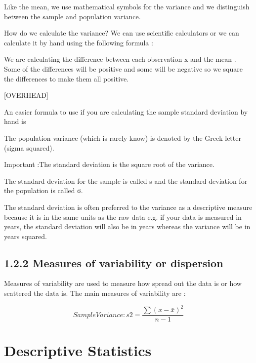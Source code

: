 \documentclass[]{report}
\begin{document}
Like the mean, we use mathematical symbols for the variance and we distinguish between the sample and population variance.






How do we calculate the variance? We can use scientific calculators or we can calculate it by hand using the following formula :


We are calculating the difference between each observation x and the mean . Some of the differences will be positive and some will be negative so we square the differences to make them all positive.

[OVERHEAD] 

An easier formula to use if you are calculating the sample standard deviation by hand is



The population variance (which is rarely know) is denoted by the Greek letter   (sigma squared).



Important :The standard deviation  is the square root of the variance.

            
 



The standard deviation for the sample is called s and the standard deviation for the population is called σ.

The standard deviation is often preferred to the variance as a descriptive measure because it is in the same units as the raw data e.g. if your data is measured in years, the standard deviation will also be in years whereas the variance will be in years squared.



\subsection{1.2.2  Measures of variability or dispersion}

Measures of variability are used to measure how spread out the data is or how scattered the data is. The main measures of variability are :




\[Sample Variance : s2    =   \frac{ \sum  (x  - \bar{x} )^2}{n -1}\]




\section{Descriptive Statistics}
\end{document}
